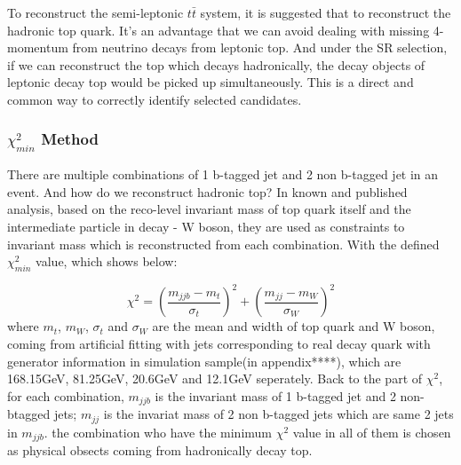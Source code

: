 		To reconstruct the semi-leptonic $t\bar{t}$ system, it is suggested that to reconstruct the hadronic top quark. It's an advantage that we can avoid dealing with missing 4-momentum from neutrino decays from leptonic top. And under the SR selection, if we can reconstruct the top which decays hadronically, the decay objects of leptonic decay top would be picked up simultaneously. This is a direct and common way to correctly identify selected candidates.

		\subsubsection{$\chi^2_{min}$ Method}
		\label{sssec:minchi2_intro} 

			There are multiple combinations of 1 b-tagged jet and 2 non b-tagged jet in an event. And how do we reconstruct hadronic top? In known and published analysis, based on the reco-level invariant mass of top quark itself and the intermediate particle in decay - W boson, they are used as constraints to invariant mass which is reconstructed from each combination. With the defined $\chi^2_{min}$ value, which shows below:

			\begin{equation}
			\chi^2 = (\frac{m_{jjb}-m_{t}}{\sigma_{t}})^2 + (\frac{m_{jj}-m_{W}}{\sigma_{W}})^2
			\label{eq:chi2}
			\end{equation}
			where $m_{t}$, $m_{W}$, $\sigma_{t}$ and $\sigma_{W}$ are the mean and width of top quark and W boson, coming from artificial fitting with jets corresponding to real decay quark with generator information in simulation sample(in appendix****), which are 168.15GeV, 81.25GeV, 20.6GeV and 12.1GeV seperately. Back to the part of $\chi^2$, for each combination, $m_{jjb}$ is the invariant mass of 1 b-tagged jet and 2 non-btagged jets; $m_{jj}$ is the invariat mass of 2 non b-tagged jets which are same 2 jets in $m_{jjb}$. the combination who have the minimum ${\chi}^{2}$ value in all of them is chosen as physical obsects coming from hadronically decay top.


